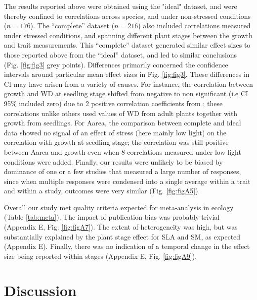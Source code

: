 \documentclass[a4paper,11pt]{article}
\begin{document}
The results reported above were obtained using the "ideal" dataset, and were thereby confined to correlations across species, and under non-stressed conditions ($n = 176$). The ``complete'' dataset ($n = 216$) also included correlations measured under stressed conditions, and spanning different plant stages between the growth and trait measurements. This ``complete'' dataset generated similar effect sizes to those reported above from the ``ideal'' dataset, and led to similar conclusions (Fig. \ref{fig:fig3} grey points). Differences primarily concerned the confidence intervals around particular mean effect sizes in Fig. \ref{fig:fig3}. These differences in CI may have arisen from a variety of causes. For instance, the correlation between growth and WD at seedling stage shifted from negative to non significant (i.e CI 95\% included zero) due to 2 positive correlation coefficients from \citet{Augspurger:1984ct}; these correlations unlike others used values of WD from adult plants together with growth from seedlings. For Aarea, the comparison between complete and ideal data showed no signal of an effect of stress (here mainly low light) on the correlation with growth at seedling stage; the correlation was still positive between Aarea and growth even when 8 correlations measured under low light conditions were added. Finally, our results were unlikely to be biased by dominance of one or a few studies that measured a large number of responses, since when multiple responses were condensed into a single average within a trait and within a study, outcomes were very similar (Fig. \ref{fig:figA5}).

Overall our study met quality criteria expected for meta-analysis in ecology (Table \ref{tab:meta}). The impact of publication bias was probably trivial (Appendix E, Fig. \ref{fig:figA7}). The extent of heterogeneity was high, but was substantially explained by the plant stage effect for SLA and SM, as expected (Appendix E). Finally, there was no indication of a temporal change in the effect size being reported within stages (Appendix E, Fig. \ref{fig:figA9}).


\section*{Discussion}\label{discussion}
\end{document}
